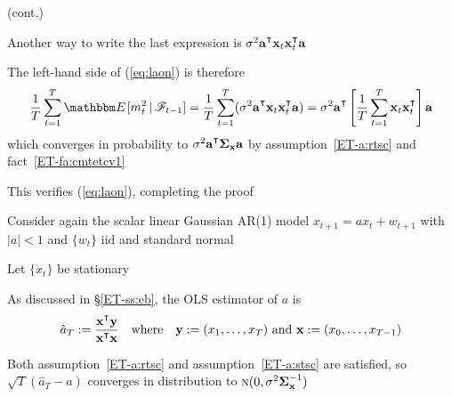 \begin{frame}

    \vspace{2em}
    \Prf (cont.)
    
    Another way to write the last expression is $\sigma^2  \bolda^\T \boldx_t
    \boldx_t^\T \bolda$
    
    The left-hand side of (\ref{eq:laon}) is therefore
    \begin{equation*}
        \frac{1}{T} \sum_{t=1}^T \EE[m_t^2 \given \fF_{t-1} ] 
        = \frac{1}{T} \sum_{t=1}^T (\sigma^2  \bolda^\T \boldx_t \boldx_t^\T \bolda)
        = \sigma^2  \bolda^\T 
        \left[ 
            \frac{1}{T} \sum_{t=1}^T  \boldx_t \boldx_t^\T
        \right]  \bolda
    \end{equation*}
    which converges in probability to $\sigma^2 \bolda^\T \Sigmax
    \bolda$ by assumption~\ref{ET-a:rtsc} and fact~\ref{ET-fa:cmtetcv1}
    
    \vspace{.7em}
    This
    verifies (\ref{eq:laon}), completing the proof \qedsymbol
    
\end{frame}

\begin{frame}

    \vspace{.7em}
    \Eg
    Consider again the scalar linear Gaussian AR(1) model $x_{t+1} = a x_t
    + w_{t+1}$ with $|a| < 1$ and $\{w_t\}$ {\sc iid} and standard normal
    
    Let $\{x_t\}$ be stationary
    
    As discussed in \S\ref{ET-ss:eb}, the OLS estimator of $a$ is 
    \begin{equation*}
        \hat a_T := \frac{\boldx^\T \boldy} {\boldx^\T \boldx}
        \quad \text{where} \quad
        \boldy := (x_1,\ldots,x_T) \text{ and  } \boldx := (x_0,\ldots,x_{T-1})
    \end{equation*}
    
    Both assumption~\ref{ET-a:rtsc} and assumption~\ref{ET-a:stsc} are satisfied,
    so $\sqrt{T} (\hat a_T - a)$ converges in distribution to 
        $\textrm{\sc n}(0, \sigma^2 {\boldsymbol \Sigma_{{\mathbf x}}^{-1}})$
    
\end{frame}

